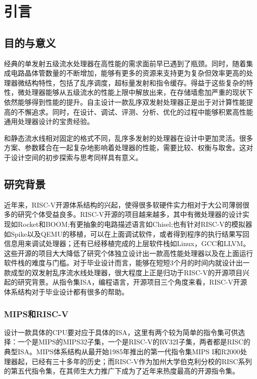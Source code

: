 \chapter{引言}\label{chap:introduction}

\section{目的与意义}

经典的单发射五级流水处理器在高性能的需求面前早已遇到了瓶颈。同时，随着集成电路晶体管数量的不断增加，能够有更多的资源来支持更为复杂但效率更高的处理器微结构特性，包括了乱序调度，超标量发射和指令缓存。得益于这些复杂的特性，微处理器能够从五级流水的性能上限中解放出来，在存储墙愈加严重的现状下依然能够得到性能的提升。自主设计一款乱序双发射处理器正是出于对计算性能提高的不懈追求。同时，在设计、调试、评测、分析、优化的过程中能够积累高性能通用处理器设计的宝贵经验。

和静态流水线相对固定的格式不同，乱序多发射的处理器在设计中更加灵活。很多方案、参数糅合在一起复杂地影响着处理器的性能，需要比较、权衡与取舍。这对于设计空间的初步探索与思考同样具有意义。

\section{研究背景}

近年来，RISC-V开源体系结构的兴起，使得很多软硬件实力相对于大公司薄弱很多的研究个体受益良多。RISC-V开源的项目越来越多，其中有微处理器的设计实现如Rocket和BOOM;有更抽象的电路描述语言如Chisel;也有针对RISC-V的模拟器如Spike以及QEMU的移植，可以在上面调试软件，或者得到程序的执行结果写回信息用来调试处理器；还有已经移植完成的上层软件栈如Linux，GCC和LLVM。这些开源的项目大大降低了研究个体独立设计出一款高性能处理器以及在上面运行软件栈的难度与门槛。对于毕业设计而言，能够在短短3个月的时间内就设计出一款成型的双发射乱序流水线处理器，很大程度上正是归功于RISC-V的开源项目兴起的研究背景。从指令集ISA，编程语言，开源项目三个角度来看，RISC-V开源体系结构对于毕业设计都有很多的帮助。

\subsection{MIPS和RISC-V}\label{subsec:ISA}
设计一款具体的CPU要对应于具体的ISA，这里有两个较为简单的指令集可供选择：一个是MIPS的MIPS32子集，一个是RISC-V的RV32I子集，两者都是RISC的典型ISA。MIPS体系结构从最开始1985年推出的第一代指令集MIPS I和R2000处理器起，已经有三十多年的历史；而RISC-V作为加州大学伯克利分校的RISC系列的第五代指令集，在其师生大力推广下成为了近年来热度最高的开源指令集。

